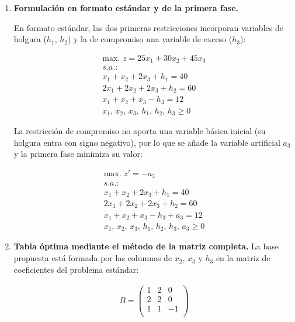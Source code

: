 \begin{enumerate}

\item \textbf{Formulación en formato estándar y de la primera fase.}

En formato estándar, las dos primeras restricciones incorporan variables de holgura ($h_1$, $h_2$) y la de compromiso una variable de exceso ($h_3$):

\begin{equation}
\begin{split}
\mbox{max. } z = 25x_1 + 30x_2 + 45x_3\\
s.a.:\\
x_1 + x_2 + 2x_3 + h_1 = 40\\
2x_1 + 2x_2 + 2x_3 + h_2 = 60\\
x_1 + x_2 + x_3 - h_3 = 12\\
x_1,\,x_2,\,x_3,\,h_1,\,h_2,\,h_3\geq 0
\end{split}
\end{equation}

La restricción de compromiso no aporta una variable básica inicial (su holgura entra con signo negativo), por lo que se añade la variable artificial $a_3$ y la primera fase minimiza su valor:

\begin{equation}
\begin{split}
\mbox{max. } z' = -a_3\\
s.a.:\\
x_1 + x_2 + 2x_3 + h_1 = 40\\
2x_1 + 2x_2 + 2x_3 + h_2 = 60\\
x_1 + x_2 + x_3 - h_3 + a_3 = 12\\
x_1,\,x_2,\,x_3,\,h_1,\,h_2,\,h_3,\,a_3\geq 0
\end{split}
\end{equation}

\item \textbf{Tabla óptima mediante el método de la matriz completa.} La base propuesta está formada por las columnas de $x_2$, $x_3$ y $h_3$ en la matriz de coeficientes del problema estándar:

\begin{equation}
\begin{split}
B =\begin{pmatrix}
1 & 2 & 0\\
2 & 2 & 0\\
1 & 1 & -1\\
\end{pmatrix}
\end{split}
\end{equation}


\end{enumerate}
